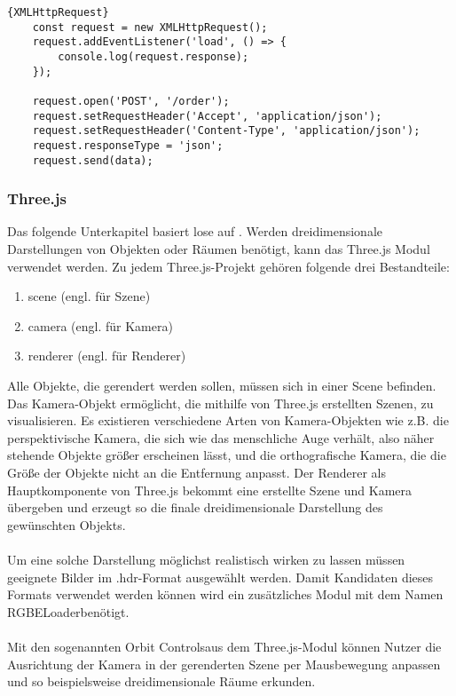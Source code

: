 \begin{lstlisting}{XMLHttpRequest}
	const request = new XMLHttpRequest();
	request.addEventListener('load', () => {
		console.log(request.response);
	});

    request.open('POST', '/order');
    request.setRequestHeader('Accept', 'application/json');
    request.setRequestHeader('Content-Type', 'application/json');
    request.responseType = 'json';
    request.send(data);
\end{lstlisting}


\subsubsection{Three.js}
Das folgende Unterkapitel basiert lose auf \cite{three:listing}. Werden dreidimensionale Darstellungen von Objekten oder Räumen benötigt, kann das Three.js Modul verwendet werden.
Zu jedem Three.js-Projekt gehören folgende drei Bestandteile:
\begin{enumerate}
	\item scene (engl. für Szene)
	\item camera (engl. für Kamera)
	\item renderer (engl. für Renderer)
\end{enumerate}
Alle Objekte, die gerendert werden sollen, müssen sich in einer Scene befinden. Das Kamera-Objekt ermöglicht, die mithilfe von Three.js erstellten Szenen, zu visualisieren. Es existieren verschiedene Arten von Kamera-Objekten wie z.B. die perspektivische Kamera, die sich wie das menschliche Auge verhält, also näher stehende Objekte größer erscheinen lässt, und die orthografische Kamera, die die Größe der Objekte nicht an die Entfernung anpasst. Der Renderer als Hauptkomponente von Three.js bekommt eine erstellte Szene und Kamera übergeben und erzeugt so die finale dreidimensionale Darstellung des gewünschten Objekts.
\\
\\
Um eine solche Darstellung möglichst realistisch wirken zu lassen müssen geeignete Bilder im \glqq .hdr\grqq -Format ausgewählt werden. Damit Kandidaten dieses Formats verwendet werden können wird ein zusätzliches Modul mit dem Namen \glqq RGBELoader\grqq \thickspace benötigt. 
\\
\\
Mit den sogenannten \glqq Orbit Controls\grqq \thinspace aus dem Three.js-Modul können Nutzer die Ausrichtung der Kamera in der gerenderten Szene per Mausbewegung anpassen und so beispielsweise dreidimensionale Räume erkunden.

